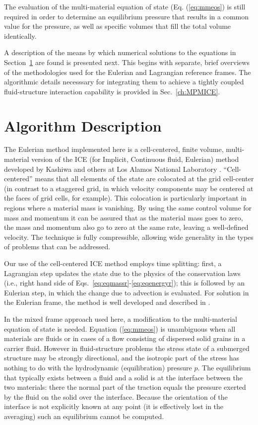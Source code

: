 The evaluation of the multi-material equation of state (Eq. (\ref{eq:mmeos})
is still required in order to determine an equilibrium pressure that results
in a common value for the  pressure, as well as specific volumes that fill
the total volume identically.

A description of the means by which numerical solutions to the equations in
Section~\ref{sec:ICE:algorithm} are found is presented next.  This begins
with separate, brief overviews of the methodologies used for the Eulerian
and Lagrangian reference frames.  The algorithmic details necesssary for
integrating them to achieve a tightly coupled fluid-structure interaction
capability is provided in Sec.~\ref{ch:MPMICE}.

\section{Algorithm Description}\label{sec:ICE:algorithm}

The Eulerian method implemented here is a cell-centered, finite volume,
multi-material version of the ICE (for Implicit, Continuous fluid, Eulerian)
method \cite{harlowamsden68} developed by Kashiwa and others at Los Alamos
National Laboratory \cite{kashiwaCCICE94}.  ``Cell-centered'' means that all
elements of the state are colocated at the grid cell-center (in contrast to
a staggered grid, in which velocity components may be centered at the faces
of grid cells, for example).  This colocation is particularly important
in regions where a material mass is vanishing.  By using the same control
volume for mass and momentum it can be assured that as the material mass goes
to zero, the mass and momentum also go to zero at the same rate, leaving a
well-defined velocity.  The technique is fully compressible, allowing wide
generality in the types of problems that can be addressed.
 
Our use of the cell-centered ICE method employs time splitting: first,
a Lagrangian step updates the state due to the physics of the conservation
laws (i.e., right hand side of Eqs.~{\ref{eq:eqmassr}-\ref{eq:eqenergyr}}); this
is followed by an Eulerian step, in which the change due to advection is
evaluated.  For solution in the Eulerian frame, the method is well developed
and described in \cite{kashiwaCCICE94}.

In the mixed frame approach used here, a modification to the multi-material
equation of state is needed.  Equation (\ref{eq:mmeos}) is unambiguous when all
materials are fluids or in cases of a flow consisting of dispersed solid grains
in a carrier fluid.  However in fluid-structure problems the stress state of a
submerged structure may be strongly directional, and the isotropic part of the
stress has nothing to do with the hydrodynamic (equilibration) pressure $p$.
The equilibrium that typically exists between a fluid and a solid is at the
interface between the two materials: there the normal part of the traction
equals the pressure exerted by the fluid on the solid over the interface.
Because the orientation of the interface is not explicitly known at any
point (it is effectively lost in the averaging) such an equilibrium cannot
be computed.

